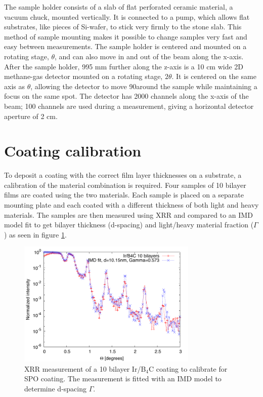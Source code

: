 The sample holder consists of a slab of flat perforated ceramic material, a vacuum chuck, mounted vertically. It is connected to a pump, which allows flat substrates, like pieces of Si-wafer, to stick very firmly to the stone slab. This method of sample mounting makes it possible to change samples very fast and easy between measurements. The sample holder is centered and mounted on a rotating stage, $\theta$, and can also move in and out of the beam along the x-axis.\\
After the sample holder, 995 mm further along the z-axis is a 10 cm wide 2D methane-gas detector mounted on a rotating stage, $2\theta$. It is centered on the same axis as $\theta$, allowing the detector to move 90\degr around the sample while maintaining a focus on the same spot. The detector has 2000 channels along the x-axis of the beam; 100 channels are used during a measurement, giving a horizontal detector aperture of 2 cm.

\section{Coating calibration}\label{sec:coating_calib}
To deposit a coating with the correct film layer thicknesses on a substrate, a calibration of the material combination is required. Four samples of 10 bilayer films are coated using the two materials. Each sample is placed on a separate mounting plate and each coated with a different thickness of both light and heavy materials. The samples are then measured using XRR and compared to an IMD\cite{Windt:1998tb} model fit to get bilayer thickness (d-spacing) and light/heavy material fraction ($\Gamma$) as seen in figure \ref{fig:irb4c-fit}.

\begin{figure}[!h]
  \center
  \includegraphics[height=6cm]{figures/chamber/si5811-fit.pdf}
\caption{\footnotesize XRR measurement of a 10 bilayer Ir/B$_4$C coating to calibrate for SPO coating. The measurement is fitted with an IMD model to determine d-spacing $\Gamma$.}\label{fig:irb4c-fit}
\end{figure}

